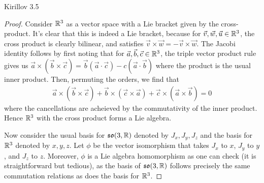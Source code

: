 \documentclass{../../mathnotes}
\begin{document}
\begin{prop}
    Kirillov 3.5
\end{prop}
\begin{proof}
    Consider $\mathbb{R}^3$ as a vector space with a Lie bracket given by the cross-product. It's clear that this is indeed a Lie bracket, because
    for $\vec v,\vec w,\vec u\in\mathbb{R}^3$, the cross product is clearly bilinear, and satisfies $\vec v\times\vec w=-\vec v\times \vec w$. The Jacobi identity
    follows by first noting that for $\vec a,\vec b,\vec c\in\mathbb{R}^3$, the triple vector product rule gives us $\vec a\times (\vec b\times \vec c)=\vec b(\vec a\cdot \vec c)-c(\vec a\cdot \vec b)$ where
    the product is the usual inner product. Then, permuting the orders, we find that
    \begin{align*}
       \vec a\times(\vec b\times \vec c)+\vec b\times(\vec c\times\vec a)+\vec c\times(\vec a\times\vec b)=0 
    \end{align*}
    where the cancellations are acheieved by the commutativity of the inner product. Hence $\mathbb{R}^3$ with the cross product forms a Lie algebra.

    Now consider the usual basis for $\mathfrak{so}(3,\mathbb{R})$ denoted by $J_x,J_y,J_z$ and the basis for $\mathbb{R}^3$ denoted by $x,y,z$. Let $\phi$ be the vector
    isomorphism that takes $J_x$ to $x$, $J_y$ to $y$, and $J_z$ to $z$. Moreover, $\phi$ is a Lie algebra homomorphism as one can check (it is straightforward
    but tedious), as the basis of $\mathfrak{so}(3,\mathbb{R})$ follows precisely the same commutation relations as does the basis for $\mathbb{R}^3$.


\end{proof}
\end{document}
